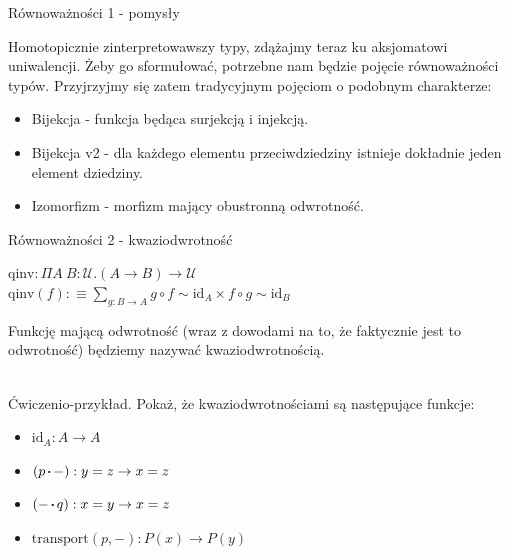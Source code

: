 \documentclass{beamer}
\newcommand{\defn}{:\equiv}
\newcommand{\U}{\mathcal{U}}
\newcommand{\id}{\text{id}}
\newcommand{\comp}{\circ}
\newcommand{\sq}{\mathbin{\vcenter{\hbox{\rule{.3ex}{.3ex}}}}}
\newcommand{\transport}{\text{transport}}
\newcommand{\qinv}{\text{qinv}}
\begin{document}
\begin{frame}{Równoważności 1 - pomysły}

Homotopicznie zinterpretowawszy typy, zdążajmy teraz ku aksjomatowi uniwalencji. Żeby go sformułować, potrzebne nam będzie pojęcie równoważności typów. Przyjrzyjmy się zatem tradycyjnym pojęciom o podobnym charakterze:

\begin{itemize}
	\item Bijekcja - funkcja będąca surjekcją i injekcją.
	\item Bijekcja v2 - dla każdego elementu przeciwdziedziny istnieje dokładnie jeden element dziedziny.
	\item Izomorfizm - morfizm mający obustronną odwrotność.
\end{itemize}
\end{frame}

\begin{frame}{Równoważności 2 - kwaziodwrotność}

\begin{definition}
$\qinv : \Pi A\ B : \U. (A \to B) \to \U$ \\
$\displaystyle \qinv(f) \defn \sum_{g : B \to A} g \comp f \sim \id_A \times f \comp g \sim \id_B$
\end{definition}

Funkcję mającą odwrotność (wraz z dowodami na to, że faktycznie jest to odwrotność) będziemy nazywać kwaziodwrotnością. \\~\

Ćwiczenio-przykład. Pokaż, że kwaziodwrotnościami są następujące funkcje:
\begin{itemize}
	\item $\id_A : A \to A$
	\item $(p \sq -) : y = z \to x = z$
	\item $(- \sq q) : x = y \to x = z$
	\item $\transport(p, -) : P(x) \to P(y)$
\end{itemize}

\end{frame}
\end{document}
